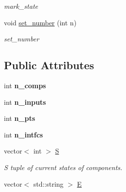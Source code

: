 \begin{DoxyCompactItemize}
\begin{DoxyCompactList}\small\item\em mark\+\_\+state \end{DoxyCompactList}\item 
void \hyperlink{class_behavior_state_ae58c468875e1c1559fdcbb262c378d7c}{set\+\_\+number} (int n)
\begin{DoxyCompactList}\small\item\em set\+\_\+number \end{DoxyCompactList}\end{DoxyCompactItemize}
\subsection*{Public Attributes}
\begin{DoxyCompactItemize}
\item 
int {\bfseries n\+\_\+comps}\hypertarget{class_behavior_state_aef4518fec5c81c14717024116848aef8}{}\label{class_behavior_state_aef4518fec5c81c14717024116848aef8}

\item 
int {\bfseries n\+\_\+inputs}\hypertarget{class_behavior_state_a317485b24596a361746c2e998b5cd5f8}{}\label{class_behavior_state_a317485b24596a361746c2e998b5cd5f8}

\item 
int {\bfseries n\+\_\+pts}\hypertarget{class_behavior_state_ae6daa12ac5ce1fc39ee33b4a01062dcc}{}\label{class_behavior_state_ae6daa12ac5ce1fc39ee33b4a01062dcc}

\item 
int {\bfseries n\+\_\+intfcs}\hypertarget{class_behavior_state_a579fc21a6331196e9f411368879a29cd}{}\label{class_behavior_state_a579fc21a6331196e9f411368879a29cd}

\item 
vector$<$ int $>$ \hyperlink{class_behavior_state_a9e74901f7f9b52884e6c77536a533c28}{S}\hypertarget{class_behavior_state_a9e74901f7f9b52884e6c77536a533c28}{}\label{class_behavior_state_a9e74901f7f9b52884e6c77536a533c28}

\begin{DoxyCompactList}\small\item\em S tuple of current states of components. \end{DoxyCompactList}\item 
vector$<$ std\+::string $>$ \hyperlink{class_behavior_state_ad3db220485edc43dd0cfee1a9fed0b3a}{E}\hypertarget{class_behavior_state_ad3db220485edc43dd0cfee1a9fed0b3a}{}\label{class_behavior_state_ad3db220485edc43dd0cfee1a9fed0b3a}


\end{DoxyCompactItemize}
